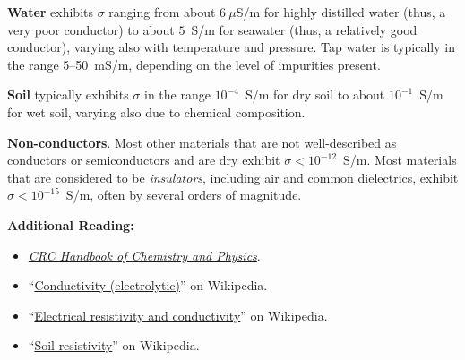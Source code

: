 {\bf Water} 
exhibits $\sigma$ ranging from 
about $6~\mu$S/m for highly distilled water (thus, a very poor conductor) to %
about $5$~S/m for seawater (thus, a relatively good conductor), varying also with temperature and pressure. %
Tap water is typically in the range 5--50~mS/m, depending on the level of impurities present. %

{\bf Soil} 
typically exhibits $\sigma$ in the range $10^{-4}$~S/m for dry soil to about $10^{-1}$~S/m for wet soil, varying also due to chemical composition. %
  
{\bf Non-conductors}.  Most other materials that are not well-described as conductors or semiconductors and are dry exhibit $\sigma < 10^{-12}$~S/m.  
Most materials that are considered to be \emph{insulators}, including air and common dielectrics, exhibit $\sigma < 10^{-15}$~S/m, often by several orders of magnitude. 


{\bf Additional Reading:}
\begin{itemize}
\item \href{http://hbcponline.com}{\emph{CRC Handbook of Chemistry and Physics}}.
\item ``\href{https://en.wikipedia.org/wiki/Conductivity_(electrolytic)}{Conductivity (electrolytic)}'' on Wikipedia.
\item ``\href{https://en.wikipedia.org/wiki/Electrical_resistivity_and_conductivity}{Electrical resistivity and conductivity}'' on Wikipedia.
\item ``\href{https://en.wikipedia.org/wiki/Soil_resistivity}{Soil resistivity}'' on Wikipedia.
\end{itemize}




